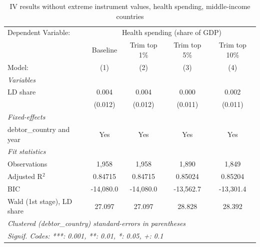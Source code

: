 
\begin{table}[htbp]
   \caption{\label{tab:results_iv_trim_top_health_other} IV results without extreme instrument values, health spending, middle-income countries}
   \centering
   \begin{tabular}{lcccc}
      \tabularnewline \midrule \midrule
      Dependent Variable: & \multicolumn{4}{c}{Health spending (share of GDP)}\\
                                 & Baseline  & Trim top 1\%  & Trim top 5\%  & Trim top 10\% \\    
      Model:                     & (1)       & (2)           & (3)           & (4)\\  
      \midrule
      \emph{Variables}\\
      LD share                   & 0.004     & 0.004         & 0.000         & 0.002\\   
                                 & (0.012)   & (0.012)       & (0.011)       & (0.011)\\   
      \midrule
      \emph{Fixed-effects}\\
      debtor\_country and year   & Yes       & Yes           & Yes           & Yes\\  
      \midrule
      \emph{Fit statistics}\\
      Observations               & 1,958     & 1,958         & 1,890         & 1,849\\  
      Adjusted R$^2$             & 0.84715   & 0.84715       & 0.85024       & 0.85204\\  
      BIC                        & -14,080.0 & -14,080.0     & -13,562.7     & -13,301.4\\  
      Wald (1st stage), LD share & 27.097    & 27.097        & 28.828        & 28.392\\  
      \midrule \midrule
      \multicolumn{5}{l}{\emph{Clustered (debtor\_country) standard-errors in parentheses}}\\
      \multicolumn{5}{l}{\emph{Signif. Codes: ***: 0.001, **: 0.01, *: 0.05, +: 0.1}}\\
   \end{tabular}
\end{table}


